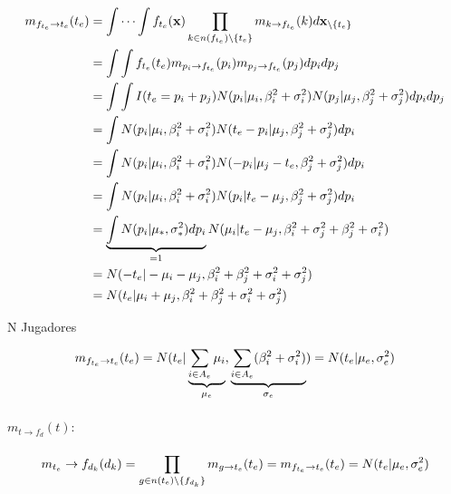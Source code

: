 \documentclass[11pt,twoside,spanish]{report} %
\begin{document}
\begin{equation}
	\centering
	\begin{split}
		m_{f_{t_e}\rightarrow t_e}(t_e) & = \int\cdots\int f_{t_e}(\textbf{x})\prod_{k\in n(f_{t_e})\backslash\{t_e\}} m_{k\rightarrow f_{t_e}}(k)d\textbf{x}_{\backslash \{t_e\}} \\
		& = \int\int f_{t_e}(t_e) m_{p_i\rightarrow f_{t_e}}(p_i)m_{p_j\rightarrow f_{t_e}}(p_j)dp_idp_j \\
		& = \int\int I(t_e=p_i+p_j)N(p_i \vert \mu_i,\beta_i^2+\sigma_i^2)N(p_j \vert \mu_j,\beta_j^2+\sigma_j^2)dp_idp_j\\
		& = \int N(p_i \vert \mu_i,\beta_i^2+\sigma_i^2)N(t_e-p_i \vert \mu_j,\beta_j^2+\sigma_j^2)dp_i\\
		& = \int N(p_i \vert \mu_i,\beta_i^2+\sigma_i^2)N(-p_i \vert \mu_j-t_e,\beta_j^2+\sigma_j^2)dp_i\\
		& = \int N(p_i \vert \mu_i,\beta_i^2+\sigma_i^2)N(p_i \vert t_e-\mu_j,\beta_j^2+\sigma_j^2)dp_i\\
		& = \underbrace{\int N(p_i \vert \mu_{\ast},\sigma_{\ast}^2)dp_i}_{=1}N(\mu_i \vert t_e-\mu_j,\beta_i^2+\sigma_j^2+\beta_j^2+\sigma_i^2)\\
		& =N(-t_e \vert -\mu_i-\mu_j,\beta_i^2+\beta_j^2+\sigma_i^2+\sigma_j^2)\\
		& =N(t_e \vert \mu_i+\mu_j,\beta_i^2+\beta_j^2+\sigma_i^2+\sigma_j	^2)\\
	\end{split}
\end{equation}

N Jugadores

\begin{equation}
	\centering
	m_{f_{t_e}\rightarrow t_e}(t_e)  = N(t_e \vert \underbrace{\sum_{i\in A_e}\mu_i}_{ \mu_e},\underbrace{\sum_{i\in A_e}(\beta_i^2+\sigma_i^2)}_{\sigma_e})
	=N(t_e \vert  \mu_e,\sigma_e^2)
\end{equation}

\paragraph{$m_{t\rightarrow f_{d}}(t):$}

\begin{equation}
	\centering
	m_{t_e}\rightarrow f_{d_k}(d_k) = \prod_{g\in n(t_e)\backslash\{f_{d_k}\}} m_{g\rightarrow t_e}(t_e)
	= m_{f_{t_e}\rightarrow t_e}(t_e)
	=  N(t_e \vert  \mu_e,\sigma_e^2)
\end{equation}
\end{document}
